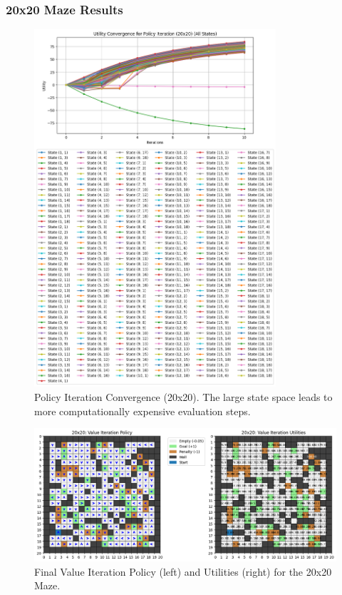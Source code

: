 \documentclass[11pt]{article}
\begin{document}
\subsubsection{20x20 Maze Results}
\begin{figure}[H]
    \centering
    \includegraphics[width=0.8\textwidth]{20x20_policy_iteration_convergence.png}
    \caption{Policy Iteration Convergence (20x20). The large state space leads to more computationally expensive evaluation steps.}
    \label{fig:20x20_pi_conv}
\end{figure}

\begin{figure}[H]
    \centering
    \includegraphics[width=\textwidth]{20x20_value_iteration.png}
    \caption{Final Value Iteration Policy (left) and Utilities (right) for the 20x20 Maze.}
    \label{fig:20x20_vi_side_by_side}
\end{figure}
\end{document}
